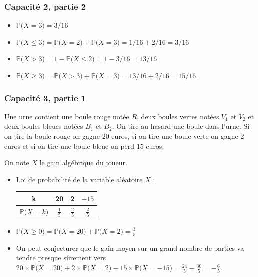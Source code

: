 \documentclass[11pt, hyperref={urlcolor=red,%
            linkcolor=blue, %
            colorlinks=true}]{beamer}
\newcommand{\proba}[1]{\mathbb{P}\big(#1\big)}
\begin{document}
\begin{frame}
\frametitle{Capacité 2,  partie 2}
\begin{itemize}
\item $\proba{X=3} = 3/16$
	\pause \item $\proba{X\leqslant 3}=  \proba{X=2} + \proba{X=3}=1/16 + 2/16=3/16$
	\pause \item $\proba{X > 3}=1 - \proba{X\leqslant 2}=1-3/16=13/16$
	\pause \item $\proba{X \geqslant 3}=\proba{X > 3}+\proba{X=3}=13/16+2/16=15/16$.
\end{itemize}
	

\end{frame}



\begin{frame}
\frametitle{Capacité 3,  partie 1}


Une urne contient une boule rouge notée $R$, deux boules vertes notées $V_{1}$ et $V_{2}$ et deux boules bleues notées $B_{1}$ et $B_{2}$. On tire au hasard une boule dans l'urne. Si on tire la boule rouge on gagne $20$ euros, si on tire une boule verte on gagne $2$ euros et si on tire une boule bleue on perd $15$ euros.

On note $X$ le gain algébrique du joueur.

\begin{itemize}
	\pause \item Loi de probabilité de la variable aléatoire $X$ :
	
\begin{center}
\begin{tabular}{|c|c|c|c|}
\hline 
k & 20 & 2 & $-15$ \\ 
\hline 
$\proba{X=k}$ & $\frac{1}{5}$ & $\frac{2}{5}$ & $\frac{2}{5}$ \\ 
\hline 
\end{tabular} 
\end{center}

	\pause \item  $\proba{X \geqslant 0}=\proba{X=20}+\proba{X=2}=\frac{3}{5}$
	
	\pause \item On peut conjecturer que le gain moyen sur un grand nombre de parties va tendre presque sûrement vers $20 \times \proba{X=20} + 2 \times \proba{X=2}-15\times \proba{X=-15}=\frac{24}{5}-\frac{30}{5}=-\frac{6}{5}$.
	
\end{itemize}
	

\end{frame}
\end{document}
